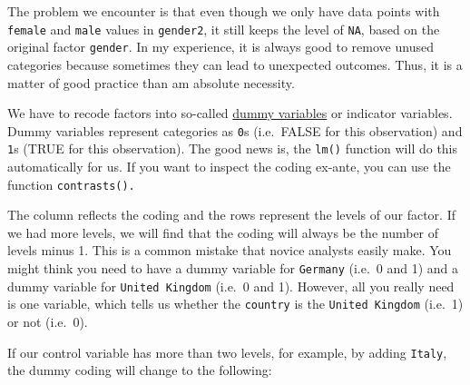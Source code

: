 \documentclass[
]{book}
\newenvironment{Shaded}{\begin{snugshade}}{\end{snugshade}}
\newcommand{\DocumentationTok}[1]{\textcolor[rgb]{0.56,0.35,0.01}{\textbf{\textit{#1}}}}
\newcommand{\FunctionTok}[1]{\textcolor[rgb]{0.00,0.00,0.00}{#1}}
\newcommand{\NormalTok}[1]{#1}
\newcommand{\SpecialCharTok}[1]{\textcolor[rgb]{0.00,0.00,0.00}{#1}}
\begin{document}
The problem we encounter is that even though we only have data points with \texttt{female} and \texttt{male} values in \texttt{gender2}, it still keeps the level of \texttt{NA}, based on the original factor \texttt{gender}. In my experience, it is always good to remove unused categories because sometimes they can lead to unexpected outcomes. Thus, it is a matter of good practice than am absolute necessity.

We have to recode factors into so-called \href{https://methods.sagepub.com/reference/the-sage-encyclopedia-of-educational-research-measurement-and-evaluation/i7682.xml?fromsearch=true}{dummy variables} or indicator variables. Dummy variables represent categories as \texttt{0}s (i.e.~FALSE for this observation) and \texttt{1}s (TRUE for this observation). The good news is, the \texttt{lm()} function will do this automatically for us. If you want to inspect the coding ex-ante, you can use the function \texttt{contrasts().}

\begin{Shaded}
\end{Shaded}

The column reflects the coding and the rows represent the levels of our factor. If we had more levels, we will find that the coding will always be the number of levels minus 1. This is a common mistake that novice analysts easily make. You might think you need to have a dummy variable for \texttt{Germany} (i.e.~0 and 1) and a dummy variable for \texttt{United\ Kingdom} (i.e.~0 and 1). However, all you really need is one variable, which tells us whether the \texttt{country} is the \texttt{United\ Kingdom} (i.e.~1) or not (i.e.~0).

If our control variable has more than two levels, for example, by adding \texttt{Italy}, the dummy coding will change to the following:
\end{document}
